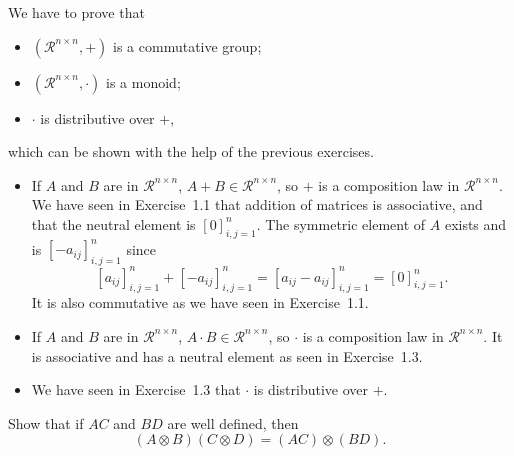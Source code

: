 \begin{solution}
  We have to prove that
  \begin{itemize}
    \item $(\mathcal{R}^{n \times n}, +)$ is a commutative group;
    \item $(\mathcal{R}^{n \times n}, \cdot)$ is a monoid;
    \item $\cdot$ is distributive over $+$,
  \end{itemize}
  which can be shown with the help of the previous exercises.
  \begin{itemize}
    \item If $A$ and $B$ are in $\mathcal{R}^{n \times n}$, $A+B \in \mathcal{R}^{n \times n}$,
      so $+$ is a composition law in $\mathcal{R}^{n \times n}$.
      We have seen in Exercise~1.1 that addition of matrices is associative, and that the neutral element is $[0]_{i,j=1}^{n}$.
      The symmetric element of $A$ exists and is $[-a_{ij}]_{i,j=1}^{n}$ since
      \[ [a_{ij}]_{i,j=1}^{n} + [-a_{ij}]_{i,j=1}^{n} = [a_{ij}-a_{ij}]_{i,j=1}^{n} = [0]_{i,j=1}^{n}. \]
      It is also commutative as we have seen in Exercise~1.1.
    \item If $A$ and $B$ are in $\mathcal{R}^{n \times n}$, $A \cdot B \in \mathcal{R}^{n \times n}$,
      so $\cdot$ is a composition law in $\mathcal{R}^{n \times n}$.
      It is associative and has a neutral element as seen in Exercise~1.3.
    \item We have seen in Exercise~1.3 that $\cdot$ is distributive over $+$.
  \end{itemize}
\end{solution}

Show that if \(AC\) and \(BD\) are well defined, then
\[
(A \otimes B)(C \otimes D) = (AC) \otimes (BD).
\]

